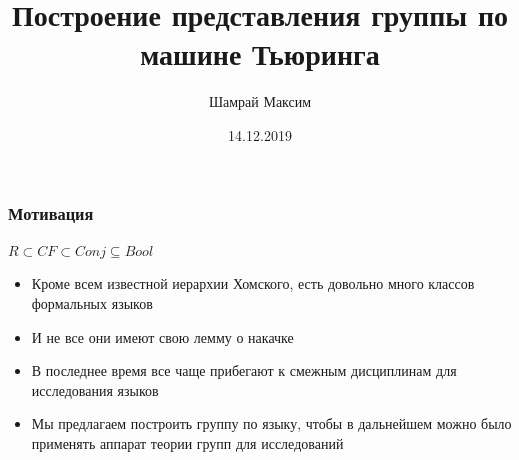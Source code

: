\documentclass[russian,english,hyperref=unicode]{beamer}
\title[Short title]{Построение представления группы по машине Тьюринга} %
\author{Шамрай Максим} %
\institute[Лаборатория языковых инструментов] %
{
Лаборатория языковых инструментов\\ %
\medskip
}
\date{14.12.2019} %
\begin{document}
\begin{frame}
\titlepage %
\end{frame}




\begin{frame}\frametitle{Мотивация}

\begin{center}
    $R \subset CF \subset Conj \subseteq Bool$
\end{center}
\begin{itemize}
    \item Кроме всем известной иерархии Хомского, есть довольно много классов формальных языков
    \item И не все они имеют свою лемму о накачке
    \item В последнее время все чаще прибегают к смежным дисциплинам для исследования языков
    \item Мы предлагаем построить группу по языку, чтобы в дальнейшем можно было применять аппарат теории групп для исследований
\end{itemize}

\end{frame}

\end{document}
